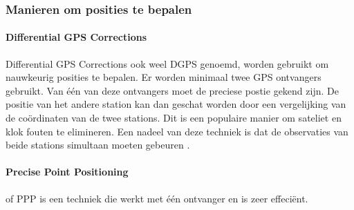 \subsubsection{Manieren om posities te bepalen}
\paragraph{Differential GPS Corrections}
Differential GPS Corrections ook weel DGPS genoemd, worden gebruikt om nauwkeurig posities  te bepalen. Er worden minimaal twee GPS ontvangers gebruikt. Van \'e\'en van deze ontvangers moet de preciese postie gekend zijn. De positie van het andere station kan dan geschat worden door een vergelijking van de co\"ordinaten van de twee stations. Dit is een populaire manier om sateliet en klok fouten te elimineren. Een nadeel van deze techniek is dat de observaties van beide stations simultaan moeten gebeuren \cite{LBibGNSS2}. 

\paragraph{Precise Point Positioning}
of PPP is een techniek die werkt met \'e\'en ontvanger en is zeer effeci\"ent. \cite{LBibGNSS4}

